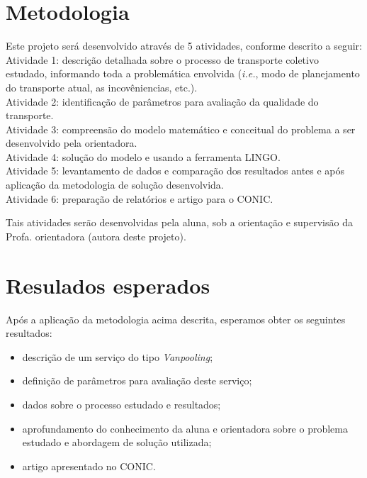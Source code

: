 \documentclass[11pt,a4paper]{article}
\begin{document}
\section{Metodologia}

Este projeto será desenvolvido através de 5 atividades, conforme descrito a seguir:\\

Atividade 1: descrição detalhada sobre o processo de transporte coletivo estudado, informando toda a problemática envolvida (\emph{i.e.}, modo de planejamento do transporte atual, as incovêniencias, etc.).\\

Atividade 2: identificação de parâmetros para avaliação da qualidade do transporte.\\

Atividade 3: compreensão do modelo matemático e conceitual do problema a ser desenvolvido pela orientadora.\\

Atividade 4: solução do modelo e usando a ferramenta LINGO.\\

Atividade 5: levantamento de dados e comparação dos resultados antes e após aplicação da metodologia de solução desenvolvida.\\

Atividade 6: preparação de relatórios e artigo para o CONIC.

Tais atividades serão desenvolvidas pela aluna, sob a orientação e supervisão da Profa. orientadora (autora deste projeto).

\section{Resulados esperados}

Após a aplicação da metodologia acima descrita, esperamos obter os seguintes resultados: 

\begin{itemize}
    \item descrição de um serviço do tipo \emph{Vanpooling};
    \item definição de parâmetros para avaliação deste serviço;
    \item dados sobre o processo estudado e resultados;
    \item aprofundamento do conhecimento da aluna e orientadora sobre o problema estudado e abordagem de solução utilizada;
    \item artigo apresentado no CONIC.
\end{itemize}
\end{document}
